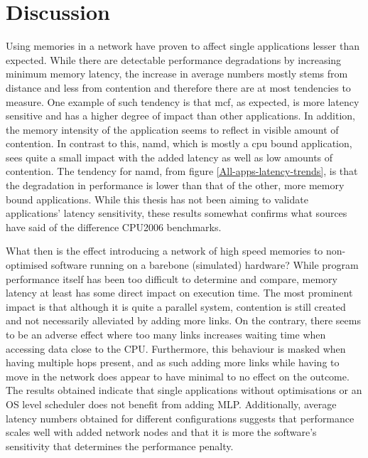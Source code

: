 \chapter{Discussion}
Using memories in a network have proven to affect single applications lesser than expected. While there are detectable performance degradations by increasing minimum memory latency, the increase in average numbers mostly stems from distance and less from contention and therefore there are at most tendencies to measure. One example of such tendency is that mcf, as expected, is more latency sensitive and has a higher degree of impact than other applications. In addition, the memory intensity of the application seems to reflect in visible amount of contention. In contrast to this, namd, which is mostly a cpu bound application, sees quite a small impact with the added latency as well as low amounts of contention. The tendency for namd, from figure \ref{All-apps-latency-trends}, is that the degradation in performance is lower than that of the other, more memory bound applications. While this thesis has not been aiming to validate applications' latency sensitivity, these results somewhat confirms what sources have said of the difference CPU2006 benchmarks.
\bigskip

What then is the effect introducing a network of high speed memories to non-optimised software running on a barebone (simulated) hardware? While program performance itself has been too difficult to determine and compare, memory latency at least has some direct impact on execution time. The most prominent impact is that although it is quite a parallel system, contention is still created and not necessarily alleviated by adding more links. On the contrary, there seems to be an adverse effect where too many links increases waiting time when accessing data close to the CPU. Furthermore, this behaviour is masked when having multiple hops present, and as such adding more links while having to move in the network does appear to have minimal to no effect on the outcome. The results obtained indicate that single applications without optimisations or an OS level scheduler does not benefit from adding MLP. Additionally, average latency numbers obtained for different configurations suggests that performance scales well with added network nodes and that it is more the software's sensitivity that determines the performance penalty. 
\bigskip

